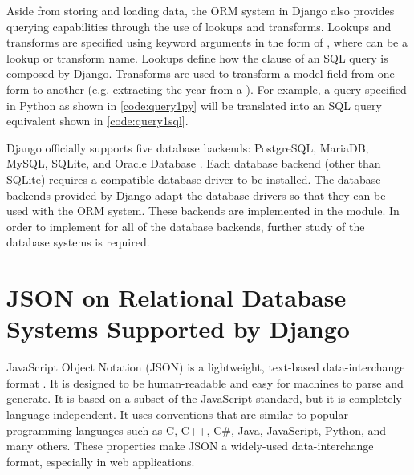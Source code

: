 



Aside from storing and loading data, the ORM system in Django also provides
querying capabilities through the use of lookups and transforms. Lookups and
transforms are specified using keyword arguments in the form of
, where  can be a lookup or
transform name. Lookups define how the  clause of an SQL query is
composed by Django. Transforms are used to transform a model field from one
form to another (e.g. extracting the year from a ). For
example, a query specified in Python as shown in \autoref{code:query1py} will
be translated into an SQL query equivalent shown in \autoref{code:query1sql}.

Django officially supports five database backends: PostgreSQL, MariaDB, MySQL,
SQLite, and Oracle Database \cite{django:databases}. Each database backend
(other than SQLite) requires a compatible database driver to be installed. The
database backends provided by Django adapt the database drivers so that they
can be used with the ORM system. These backends are implemented in the
 module. In order to implement  for
all of the database backends, further study of the database systems is
required.

\section{JSON on Relational Database Systems Supported by Django}

JavaScript Object Notation (JSON) is a lightweight, text-based data-interchange
format \cite{json}. It is designed to be human-readable and easy for machines
to parse and generate. It is based on a subset of the JavaScript standard, but
it is completely language independent. It uses conventions that are similar to
popular programming languages such as C, C++, C\#, Java, JavaScript, Python,
and many others. These properties make JSON a widely-used data-interchange
format, especially in web applications.

